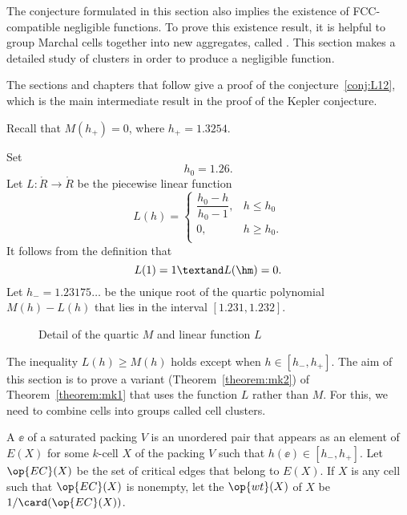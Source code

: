 The conjecture formulated in this section also implies the existence
of FCC-compatible negligible functions.  To prove this existence result, it is
helpful to group Marchal cells together into new aggregates, called
.  This section makes a detailed study of clusters
in order to produce a negligible function.

The sections and chapters that follow give a proof of the
conjecture~\ref{conj:L12},  which is the
main intermediate result in the proof of the Kepler
conjecture.


Recall that $M(h_+) = 0$, where   $h_+ = 1.3254$.
%

\begin{definition}[$L$,~$h_0$,~$h_-$]\label{def:L} 
Set
\[  
h_0 = 1.26.%
\] 
Let $L:\ring{R}\to\ring{R}$ be the piecewise linear function 
\[  
L(h) = \begin{cases} 
\dfrac{h_0-h}{h_0-1}, & h \le h_0 \\
0, & h\ge h_0. \\
\end{cases}
\] 
It follows from the definition that
\[  
L(1) = 1\textand  L(\hm) = 0.
\] 
Let $h_- = 1.23175\ldots$ be the unique root of the quartic polynomial
$M(h)-L(h)$ that lies in the interval $[1.231,1.232]$.
%
%
%
\end{definition}

\begin{figure}[htb]
\centering
{}
\caption{Detail of the quartic $M$ and linear function $L$}
\label{fig:L}
\end{figure}

The inequality $L(h)\ge M(h)$ holds except when $h\in [h_-,h_+]$.  The
aim of this section is to prove a variant (Theorem~\ref{theorem:mk2})
of Theorem~\ref{theorem:mk1}
that uses the function $L$ rather than $M$.  For this, we need to
combine cells into groups called cell clusters.

\begin{definition}\label{def:wt} 
A  $\ee$ of a saturated packing $V$ is an unordered pair
that appears as an element of $E(X)$ for some 
$k$-cell $X$ of the packing $V$ such that
$h(\ee)\in[h_-,h_+]$.  Let $\op{EC}(X)$ 
be the set of critical edges that belong to $E(X)$.  If $X$ is any cell such
that $\op{EC}(X)$ is nonempty, let the  $\op{wt}(X)$ of $X$ be
$1/\card(\op{EC}(X))$.
\end{definition}
%
%
%

